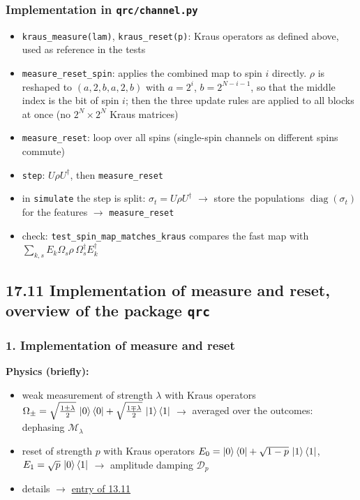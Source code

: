 \subsubsection*{Implementation in \texttt{qrc/channel.py}}
\begin{itemize}
    \item \texttt{kraus\_measure(lam)}, \texttt{kraus\_reset(p)}: Kraus operators as defined above, used as
    reference in the tests
    \item \texttt{measure\_reset\_spin}: applies the combined map to spin $i$ directly. $\rho$ is reshaped to
    $(a, 2, b, a, 2, b)$ with $a = 2^i$, $b = 2^{N-i-1}$, so that the middle index is the bit of spin $i$;
    then the three update rules are applied to all blocks at once (no $2^N \times 2^N$ Kraus matrices)
    \item \texttt{measure\_reset}: loop over all spins (single-spin channels on different spins commute)
    \item \texttt{step}: $U\rho U^\dagger$, then \texttt{measure\_reset}
    \item in \texttt{simulate} the step is split: $\sigma_t = U\rho U^\dagger$ $\to$ store the populations
    $\operatorname{diag}(\sigma_t)$ for the features $\to$ \texttt{measure\_reset}
    \item check: \texttt{test\_spin\_map\_matches\_kraus} compares the fast map with
    $\sum_{k,s} E_k \Omega_s \rho\, \Omega_s^\dagger E_k^\dagger$
\end{itemize}

\subsection*{17.11 \quad Implementation of measure and reset, overview of the package \texttt{qrc}}
\label{sec:qrc-overview}

\subsubsection*{1. Implementation of measure and reset}
\textbf{Physics (briefly):}
\begin{itemize}
    \item weak measurement of strength $\lambda$ with Kraus operators
    $\Omega_\pm = \sqrt{\frac{1\pm\lambda}{2}}\, \ket{0}\bra{0} + \sqrt{\frac{1\mp\lambda}{2}}\, \ket{1}\bra{1}$
    $\to$ averaged over the outcomes: dephasing $\mathcal{M}_\lambda$
    \item reset of strength $p$ with Kraus operators
    $E_0 = \ket{0}\bra{0} + \sqrt{1-p}\, \ket{1}\bra{1}$, $E_1 = \sqrt{p}\, \ket{0}\bra{1}$
    $\to$ amplitude damping $\mathcal{D}_p$
    \item details $\to$ \hyperref[sec:new-protocol]{entry of 13.11}
\end{itemize}

